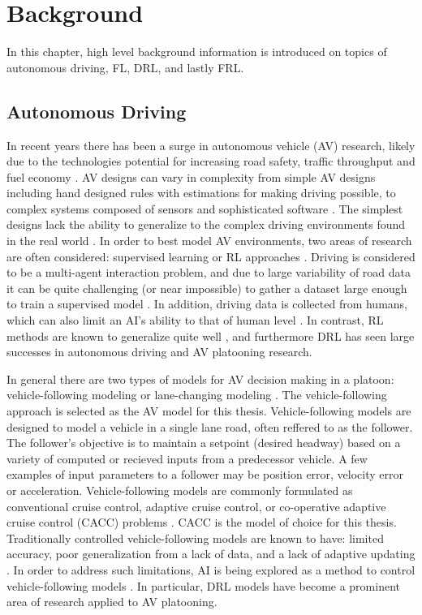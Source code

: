 \chapter{Background} \label{chap:background}
In this chapter, high level background information is introduced on topics of autonomous
driving, FL, DRL, and lastly FRL.

\section{Autonomous Driving}
In recent years there has been a surge in autonomous vehicle (AV) research, likely due
to the technologies potential for increasing road safety, traffic throughput and fuel
economy \cite{Makantasis2020a, Ye2019}. AV designs can vary in complexity from simple
AV designs including hand designed rules with estimations for making driving possible,
to complex systems composed of sensors and sophisticated software  \cite{Makantasis2020a}.
The simplest designs lack the ability to generalize to the complex driving environments
found in the real world \cite{Makantasis2020a}. In order to best model AV environments,
two areas of research are often considered: supervised learning or RL approaches
\cite{Makantasis2020a}.  Driving is considered to be a multi-agent interaction problem,
and due to large variability of road data it can be quite challenging (or near impossible)
to gather a dataset large enough to train a supervised model \cite{ElSallab2017a}.
In addition, driving data is collected from humans, which can also limit an AI's ability
to that of human level \cite{Ye2019}. In contrast, RL methods are known to generalize
quite well \cite{Makantasis2020a}, and furthermore DRL has seen
large successes in autonomous driving and AV platooning research.

In general there are two types of models for AV decision making in a platoon: vehicle-following
modeling or lane-changing modeling \cite{Ye2019}. The vehicle-following approach is
selected as the AV model for this thesis.  Vehicle-following
models are designed to model a vehicle in a single lane road, often reffered to as the follower. The follower's objective
is to maintain a setpoint (desired headway) based on a variety of computed or recieved inputs from a predecessor vehicle.
A few examples of input parameters to a follower may be position error, velocity error or acceleration.
Vehicle-following models are commonly formulated as conventional cruise control,
adaptive cruise control, or co-operative adaptive cruise control (CACC) problems \cite{Mil2014}.
CACC is the model of choice for this thesis. Traditionally controlled vehicle-following models
are known to have: limited accuracy, poor generalization from a lack of data,
and a lack of adaptive updating \cite{Zhu2018}. In order to address such limitations,
AI is being explored as a method to control vehicle-following models \cite{Zhu2018}.
In particular, DRL models have become a prominent area of research applied to AV platooning.


